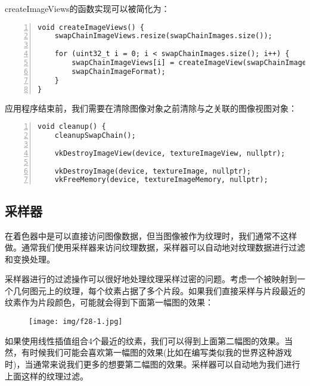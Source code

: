 \documentclass{ctexart}
\begin{document}
createImageViews的函数实现可以被简化为：

\begin{lstlisting}[language={[ANSI]C},keywordstyle=\color{blue!70},commentstyle=\color{red!50!green!50!blue!50},frame=shadowbox, rulesepcolor=\color{red!20!green!20!blue!20},basicstyle=\small,numbers=left, numberstyle=\tiny,breaklines=true]
void createImageViews() {
	swapChainImageViews.resize(swapChainImages.size());

	for (uint32_t i = 0; i < swapChainImages.size(); i++) {
		swapChainImageViews[i] = createImageView(swapChainImages[i],
		swapChainImageFormat);
	}
}
\end{lstlisting}

应用程序结束前，我们需要在清除图像对象之前清除与之关联的图像视图对象：

\begin{lstlisting}[language={[ANSI]C},keywordstyle=\color{blue!70},commentstyle=\color{red!50!green!50!blue!50},frame=shadowbox, rulesepcolor=\color{red!20!green!20!blue!20},basicstyle=\small,numbers=left, numberstyle=\tiny,breaklines=true]
void cleanup() {
	cleanupSwapChain();

	vkDestroyImageView(device, textureImageView, nullptr);

	vkDestroyImage(device, textureImage, nullptr);
	vkFreeMemory(device, textureImageMemory, nullptr);
\end{lstlisting}

\subsection{采样器}

在着色器中是可以直接访问图像数据，但当图像被作为纹理时，我们通常不这样做。通常我们使用采样器来访问纹理数据，采样器可以自动地对纹理数据进行过滤和变换处理。

采样器进行的过滤操作可以很好地处理纹理采样过密的问题。考虑一个被映射到一个几何图元上的纹理，每个纹素占据了多个片段。如果我们直接采样与片段最近的纹素作为片段颜色，可能就会得到下面第一幅图的效果：

\begin{figure}[H]
	\centering
	\texttt{[image: img/f28-1.jpg]}
\end{figure}

如果使用线性插值组合4个最近的纹素，我们可以得到上面第二幅图的效果。当然，有时候我们可能会喜欢第一幅图的效果(比如在编写类似我的世界这种游戏时)，当通常来说我们更多的想要第二幅图的效果。采样器可以自动地为我们进行上面这样的纹理过滤。
\end{document}

